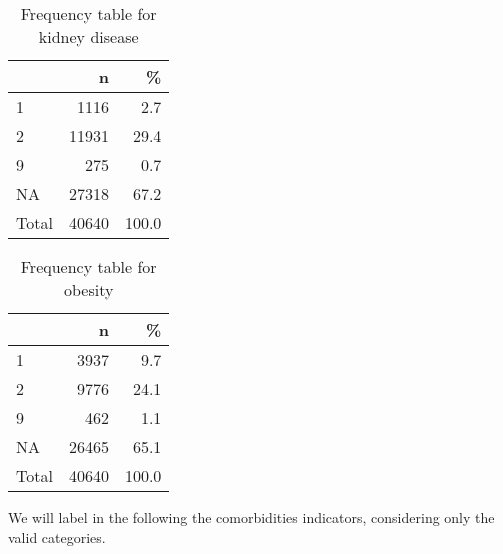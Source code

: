\documentclass[
]{article}
\newenvironment{Shaded}{\begin{snugshade}}{\end{snugshade}}
\newcommand{\DataTypeTok}[1]{\textcolor[rgb]{0.13,0.29,0.53}{#1}}
\newcommand{\DecValTok}[1]{\textcolor[rgb]{0.00,0.00,0.81}{#1}}
\newcommand{\KeywordTok}[1]{\textcolor[rgb]{0.13,0.29,0.53}{\textbf{#1}}}
\newcommand{\NormalTok}[1]{#1}
\newcommand{\OperatorTok}[1]{\textcolor[rgb]{0.81,0.36,0.00}{\textbf{#1}}}
\newcommand{\OtherTok}[1]{\textcolor[rgb]{0.56,0.35,0.01}{#1}}
\newcommand{\StringTok}[1]{\textcolor[rgb]{0.31,0.60,0.02}{#1}}
\begin{document}
\begin{table}[!h]

\caption{\label{tab:unnamed-chunk-37}Frequency table for kidney disease}
\centering
\begin{tabular}[t]{l|r|r}
\hline
  & n & \%\\
\hline
1 & 1116 & 2.7\\
\hline
2 & 11931 & 29.4\\
\hline
9 & 275 & 0.7\\
\hline
NA & 27318 & 67.2\\
\hline
Total & 40640 & 100.0\\
\hline
\end{tabular}
\end{table}

\begin{Shaded}
\end{Shaded}

\begin{table}[!h]

\caption{\label{tab:unnamed-chunk-38}Frequency table for obesity}
\centering
\begin{tabular}[t]{l|r|r}
\hline
  & n & \%\\
\hline
1 & 3937 & 9.7\\
\hline
2 & 9776 & 24.1\\
\hline
9 & 462 & 1.1\\
\hline
NA & 26465 & 65.1\\
\hline
Total & 40640 & 100.0\\
\hline
\end{tabular}
\end{table}

We will label in the following the comorbidities indicators, considering
only the valid categories.
\end{document}
